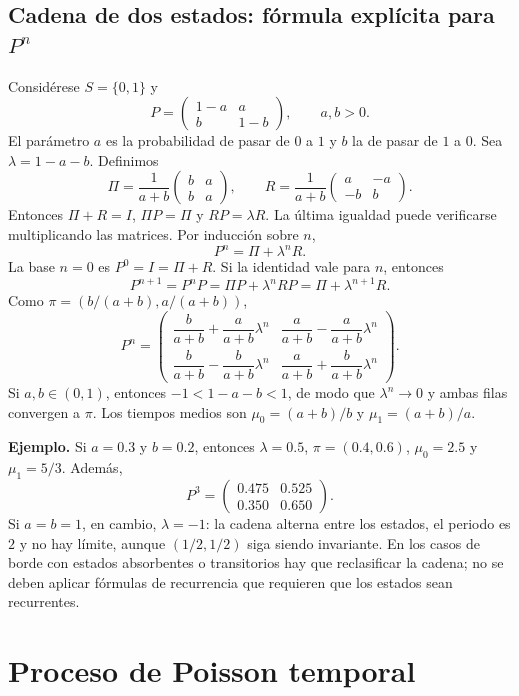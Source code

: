 \documentclass[11pt,oneside]{article}
\newcommand{\1}{\mathbf{1}}
\begin{document}
\subsection{Cadena de dos estados: fórmula explícita para \texorpdfstring{$P^n$}{P a la n}}

Considérese $S=\{0,1\}$ y
\[
P=\begin{pmatrix}1-a&a\\ b&1-b\end{pmatrix},\qquad a,b>0.
\]
El parámetro $a$ es la probabilidad de pasar de $0$ a $1$ y $b$ la de pasar de $1$ a $0$. Sea $\lambda=1-a-b$. Definimos
\[
\Pi=\frac{1}{a+b}\begin{pmatrix}b&a\\b&a\end{pmatrix},\qquad
R=\frac{1}{a+b}\begin{pmatrix}a&-a\\-b&b\end{pmatrix}.
\]
Entonces $\Pi+R=I$, $\Pi P=\Pi$ y $RP=\lambda R$. La última igualdad puede verificarse multiplicando las matrices. Por inducción sobre $n$,
\[
\boxed{P^n=\Pi+\lambda^n R.}
\]
La base $n=0$ es $P^0=I=\Pi+R$. Si la identidad vale para $n$, entonces
\[
P^{n+1}=P^nP=\Pi P+\lambda^nRP=\Pi+\lambda^{n+1}R.
\]
Como $\pi=(b/(a+b),a/(a+b))$,
\[
P^n=\begin{pmatrix}
\dfrac{b}{a+b}+\dfrac{a}{a+b}\lambda^n &
\dfrac{a}{a+b}-\dfrac{a}{a+b}\lambda^n\\[0.8em]
\dfrac{b}{a+b}-\dfrac{b}{a+b}\lambda^n &
\dfrac{a}{a+b}+\dfrac{b}{a+b}\lambda^n
\end{pmatrix}.
\]
Si $a,b\in(0,1)$, entonces $-1<1-a-b<1$, de modo que $\lambda^n\to0$ y ambas filas convergen a $\pi$. Los tiempos medios son $\mu_0=(a+b)/b$ y $\mu_1=(a+b)/a$.

\textbf{Ejemplo.} Si $a=0.3$ y $b=0.2$, entonces $\lambda=0.5$, $\pi=(0.4,0.6)$, $\mu_0=2.5$ y $\mu_1=5/3$. Además,
\[
P^3=\begin{pmatrix}0.475&0.525\\0.350&0.650\end{pmatrix}.
\]
Si $a=b=1$, en cambio, $\lambda=-1$: la cadena alterna entre los estados, el periodo es $2$ y no hay límite, aunque $(1/2,1/2)$ siga siendo invariante. En los casos de borde con estados absorbentes o transitorios hay que reclasificar la cadena; no se deben aplicar fórmulas de recurrencia que requieren que los estados sean recurrentes.

\section{Proceso de Poisson temporal}
\end{document}
